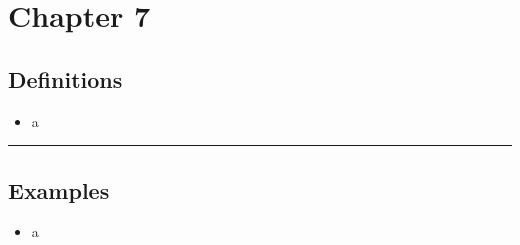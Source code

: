 \documentclass[12pt]{article}
\begin{document}

\newpage
\section{Chapter 7}

\subsection{Definitions}
\begin{itemize}
    \item a
\end{itemize}
\noindent\rule{\linewidth}{1pt}

\subsection{Examples}
\begin{itemize}
    \item a
\end{itemize}

\end{document}
